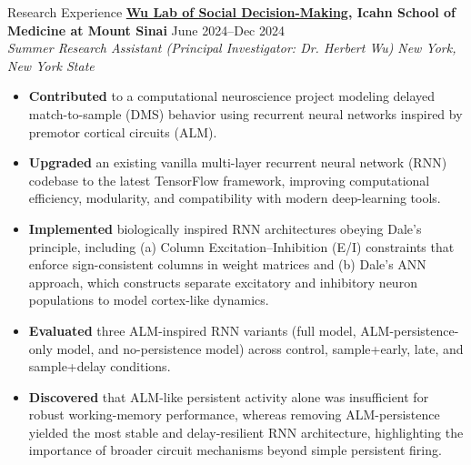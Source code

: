 \documentclass{resume} %
\begin{document}
\begin{rSection}{Research Experience}
\textbf{\href{https://www.wulab.bio/}{Wu Lab of Social Decision-Making}, Icahn School of Medicine at Mount Sinai} \hfill{June 2024--Dec 2024} \\
\textit{Summer Research Assistant (Principal Investigator: Dr. Herbert Wu)} \hfill{\textit{New York, New York State}}
 \begin{itemize}
    \itemsep -5pt {} 
     \item \textbf{Contributed} to a computational neuroscience project modeling delayed match-to-sample (DMS) behavior using recurrent neural networks inspired by premotor cortical circuits (ALM).
     \item \textbf{Upgraded} an existing vanilla multi-layer recurrent neural network (RNN) codebase to the latest TensorFlow framework, improving computational efficiency, modularity, and compatibility with modern deep-learning tools.
     \item \textbf{Implemented} biologically inspired RNN architectures obeying Dale’s principle, including (a) Column Excitation–Inhibition (E/I) constraints that enforce sign-consistent columns in weight matrices and (b) Dale’s ANN approach, which constructs separate excitatory and inhibitory neuron populations to model cortex-like dynamics.
     \item \textbf{Evaluated} three ALM-inspired RNN variants (full model, ALM-persistence-only model, and no-persistence model) across control, sample+early, late, and sample+delay conditions.
     \item \textbf{Discovered} that ALM-like persistent activity alone was insufficient for robust working-memory performance, whereas removing ALM-persistence yielded the most stable and delay-resilient RNN architecture, highlighting the importance of broader circuit mechanisms beyond simple persistent firing. 
 \end{itemize}


\end{rSection}
\end{document}
